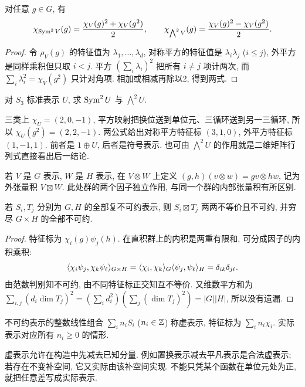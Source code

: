 \begin{proposition}\label{prop:symext}
对任意 $g\in G$, 有
\[
 \chi_{\operatorname{Sym}^2V}(g)=\frac{\chi_V(g)^2+\chi_V(g^2)}2,\qquad
 \chi_{\bigwedge^2V}(g)=\frac{\chi_V(g)^2-\chi_V(g^2)}2.
\]
\end{proposition}
\begin{proof}
令 $\rho_V(g)$ 的特征值为 $\lambda_1,\ldots,\lambda_d$, 对称平方的特征值是 $\lambda_i\lambda_j$ ($i\le j$), 外平方是同样乘积但只取 $i<j$. 平方 $(\sum_i\lambda_i)^2$ 把所有 $i\ne j$ 项计两次, 而 $\sum_i\lambda_i^2=\chi_V(g^2)$ 只计对角项. 相加或相减再除以2, 得到两式.
\end{proof}

\begin{example}
对 $S_3$ 标准表示 $U$, 求 $\operatorname{Sym}^2U$ 与 $\bigwedge^2U$.
\end{example}
\begin{solution}
三类上 $\chi_U=(2,0,-1)$, 平方映射把换位送到单位元、三循环送到另一三循环, 所以 $\chi_U(g^2)=(2,2,-1)$. 两公式给出对称平方特征标 $(3,1,0)$, 外平方特征标 $(1,-1,1)$. 前者是 $1\oplus U$, 后者是符号表示. 也可由 $\bigwedge^2U$ 的作用就是二维矩阵行列式直接看出后一结论.
\end{solution}

若 $V$ 是 $G$ 表示, $W$ 是 $H$ 表示, 在 $V\otimes W$ 上定义 $(g,h)(v\otimes w)=gv\otimes hw$, 记为外张量积 $V\boxtimes W$. 此处群的两个因子独立作用, 与同一个群的内部张量积有所区别.

\begin{theorem}\label{thm:products}
若 $S_i,T_j$ 分别为 $G,H$ 的全部复不可约表示, 则 $S_i\boxtimes T_j$ 两两不等价且不可约, 并穷尽 $G\times H$ 的全部不可约.
\end{theorem}
\begin{proof}
特征标为 $\chi_i(g)\psi_j(h)$. 在直积群上的内积是两重有限和, 可分成因子的内积乘积:
\[
 \langle \chi_i\psi_j,\chi_k\psi_\ell\rangle_{G\times H}
 =\langle \chi_i,\chi_k\rangle_G\langle \psi_j,\psi_\ell\rangle_H
 =\delta_{ik}\delta_{j\ell}.
\]
由范数判别知不可约, 由不同特征标正交知互不等价. 又维数平方和为
$\sum_{i,j}(d_i\dim T_j)^2=(\sum_i d_i^2)(\sum_j(\dim T_j)^2)=|G||H|$, 所以没有遗漏.
\end{proof}

\begin{definition}
不可约表示的整数线性组合 $\sum_i n_i S_i$ ($n_i\in\mathbb Z$) 称虚表示, 特征标为 $\sum_i n_i\chi_i$. 实际表示对应所有 $n_i\ge0$ 的情形.
\end{definition}
虚表示允许在构造中先减去已知分量. 例如置换表示减去平凡表示是合法虚表示; 若存在不变补空间, 它又实际由该补空间实现. 不能只凭某个函数在单位元处为正, 就把任意差写成实际表示.

